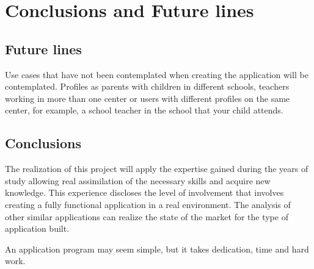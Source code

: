 %
%
%
%

\cleardoublepage
\chapter{Conclusions and Future lines}
\label{chap:futureLines}

	\section{Future lines}
		Use cases that have not been contemplated when creating the application will be contemplated. Profiles as parents with children in different schools, teachers working in more than one center or users with different profiles on the same center, for example, a school teacher in the school that your child attends.
	
	\section{Conclusions}
		The realization of this project will apply the expertise gained during the years of study allowing real assimilation of the necessary skills and acquire new knowledge.
		This experience discloses the level of involvement that involves creating a fully functional application in a real environment. The analysis of other similar applications can realize the state of the market for the type of application built.
		
		\bigskip
		An application program may seem simple, but it takes dedication, time and hard work.